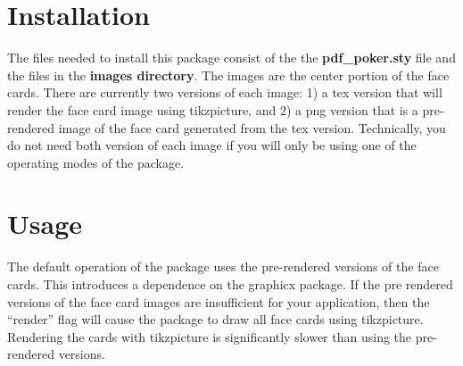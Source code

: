 \documentclass[11pt]{article}
\begin{document}
\begin{centering}
\CardAceSpades[0.3]
\CardTwoSpades[0.3]
\CardThreeSpades[0.3]
\CardFourSpades[0.3]
\CardFiveSpades[0.3]
\CardSixSpades[0.3]
\CardSevenSpades[0.3]
\CardEightSpades[0.3]
\CardNineSpades[0.3]
\CardTenSpades[0.3]
\CardJackSpades[0.3]
\CardQueenSpades[0.3]
\CardKingSpades[0.3]

\CardAceHearts[0.3]
\CardTwoHearts[0.3]
\CardThreeHearts[0.3]
\CardFourHearts[0.3]
\CardFiveHearts[0.3]
\CardSixHearts[0.3]
\CardSevenHearts[0.3]
\CardEightHearts[0.3]
\CardNineHearts[0.3]
\CardTenHearts[0.3]
\CardJackHearts[0.3]
\CardQueenHearts[0.3]
\CardKingHearts[0.3]

\CardAceDiamonds[0.3]
\CardTwoDiamonds[0.3]
\CardThreeDiamonds[0.3]
\CardFourDiamonds[0.3]
\CardFiveDiamonds[0.3]
\CardSixDiamonds[0.3]
\CardSevenDiamonds[0.3]
\CardEightDiamonds[0.3]
\CardNineDiamonds[0.3]
\CardTenDiamonds[0.3]
\CardJackDiamonds[0.3]
\CardQueenDiamonds[0.3]
\CardKingDiamonds[0.3]

\CardAceClubs[0.3]
\CardTwoClubs[0.3]
\CardThreeClubs[0.3]
\CardFourClubs[0.3]
\CardFiveClubs[0.3]
\CardSixClubs[0.3]
\CardSevenClubs[0.3]
\CardEightClubs[0.3]
\CardNineClubs[0.3]
\CardTenClubs[0.3]
\CardJackClubs[0.3]
\CardQueenClubs[0.3]
\CardKingClubs[0.3]

\end{centering}

\vspace*{\baselineskip}

\section{Installation}

The files needed to install this package consist of the the
\textbf{pdf\_poker.sty} file and the files in the \textbf{images
  directory}.  The images are the center portion of the face cards.
There are currently two versions of each image: 1) a tex version that
will render the face card image using tikzpicture, and 2) a png
version that is a pre-rendered image of the face card generated from
the tex version.  Technically, you do not need both version of each
image if you will only be using one of the operating modes of the
package.

\section{Usage}

The default operation of the package uses the pre-rendered versions of
the face cards.  This introduces a dependence on the graphicx package.
If the pre rendered versions of the face card images are insufficient
for your application, then the ``render'' flag will cause the package
to draw all face cards using tikzpicture.  Rendering the cards with
tikzpicture is significantly slower than using the pre-rendered
versions.
\end{document}
